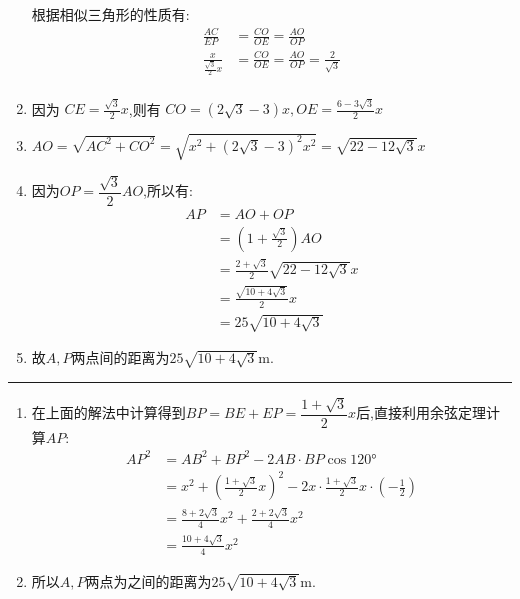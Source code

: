 \begin{questions}
\begin{solution}
\begin{enumerate}[label=\protect\circled{\arabic*}, noitemsep]
			      根据相似三角形的性质有:
			      \begin{align*}
				      \frac{AC}{EP}                 & = \frac{CO}{OE} = \frac{AO}{OP}                     \\
				      \frac{x}{\frac{\sqrt{3}}{2}x} & = \frac{CO}{OE} = \frac{AO}{OP}= \frac{2}{\sqrt{3}} \\
			      \end{align*}
			\item 因为 \( CE=\frac{\sqrt{3}}{2}x \),则有 \( CO = (2\sqrt{3} - 3)x, OE = \frac{6 - 3\sqrt{3}}{2}x \)
			\item \( AO = \sqrt{AC^2 + CO^2} = \sqrt{x^2 + (2\sqrt{3} - 3)^2x^2} = \sqrt{22 - 12\sqrt{3}}x \)
			\item 因为$OP=\dfrac{\sqrt{3}}{2}AO$,所以有:
			      \begin{align*}
				      AP & = AO + OP                                     \\
				         & = (1+\frac{\sqrt{3}}{2})AO                    \\
				         & = \frac{2+\sqrt{3}}{2}\sqrt{22 - 12\sqrt{3}}x \\
				         & = \frac{\sqrt{10 + 4\sqrt{3}}}{2}x            \\
				         & = 25\sqrt{10 + 4\sqrt{3}}
			      \end{align*}
			\item 故$A,P$两点间的距离为$25\sqrt{10+4\sqrt{3}}\unit{\meter}$.
		\end{enumerate}
		\hrule
		\begin{enumerate}[label=\protect\circled{\arabic*}]
			\color{green!50!blue}
			\item 在上面的解法中计算得到$BP=BE+EP=\dfrac{1+\sqrt{3}}{2}x$后,直接利用余弦定理计算$AP$:
			      \begin{align*}
				      AP^2 & = AB^2 + BP^2 - 2AB\cdot BP\cos\ang{120}                                                     \\
				           & = x^2 + \left( \frac{1+\sqrt{3}}{2}x \right)^2 - 2x\cdot\frac{1+\sqrt{3}}{2}x\cdot(-\frac12) \\
				           & = \frac{8+2\sqrt{3}}{4}x^2 + \frac{2+2\sqrt{3}}{4}x^2                                        \\
				           & = \frac{10+4\sqrt{3}}{4}x^2
			      \end{align*}
			\item 所以$A,P$两点为之间的距离为$25\sqrt{10+4\sqrt{3}}\unit{\meter}$.
		\end{enumerate}
	\end{solution}


\end{questions}
